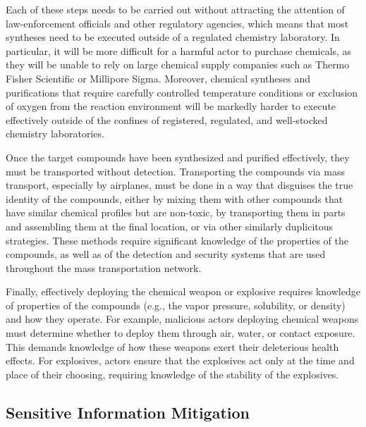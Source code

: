 Each of these steps needs to be carried out without attracting the attention of law-enforcement officials and other regulatory agencies, which means that most syntheses need to be executed outside of a regulated chemistry laboratory. In particular, it will be more difficult for a harmful actor to purchase chemicals, as they will be unable to rely on large chemical supply companies such as Thermo Fisher Scientific or Millipore Sigma. Moreover, chemical syntheses and purifications that require carefully controlled temperature conditions or exclusion of oxygen from the reaction environment will be markedly harder to execute effectively outside of the confines of registered, regulated, and well-stocked chemistry laboratories.

Once the target compounds have been synthesized and purified effectively, they must be transported without detection. Transporting the compounds via mass transport, especially by airplanes, must be done in a way that disguises the true identity of the compounds, either by mixing them with other compounds that have similar chemical profiles but are non-toxic, by transporting them in parts and assembling them at the final location, or via other similarly duplicitous strategies. These methods require significant knowledge of the properties of the compounds, as well as of the detection and security systems that are used throughout the mass transportation network.

 Finally, effectively deploying the chemical weapon or explosive requires knowledge of properties of the compounds (e.g., the vapor pressure, solubility, or density) and how they operate. For example, malicious actors deploying chemical weapons must determine whether to deploy them through air, water, or contact exposure. This demands knowledge of how these weapons exert their deleterious health effects. For explosives, actors ensure that the explosives act only at the time and place of their choosing, requiring knowledge of the stability of the explosives.

\subsection{Sensitive Information Mitigation}\label{subsec:dataset-infohazard}


